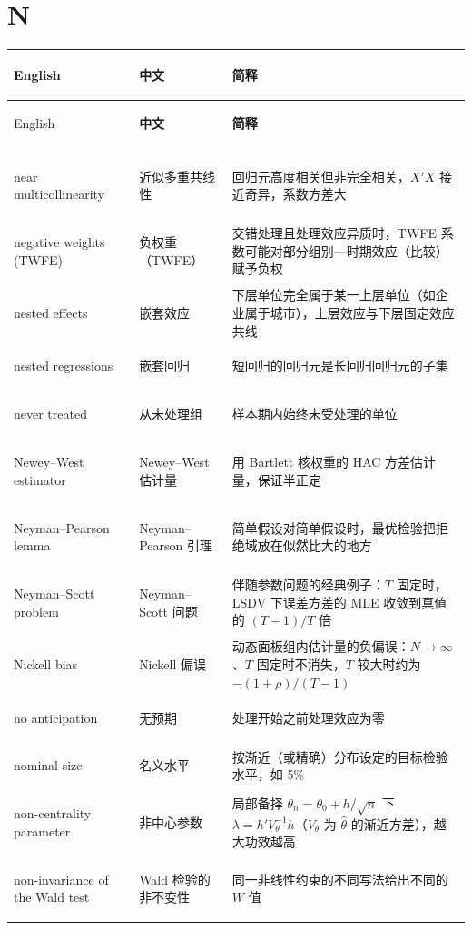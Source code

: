 \section*{N}
\begin{longtable}{@{}>{\bfseries\boldmath\raggedright\arraybackslash}p{4.6cm}>{\raggedright\arraybackslash}p{3.2cm}>{\raggedright\arraybackslash}p{\dimexpr\textwidth-7.8cm-4\tabcolsep\relax}@{}}
\toprule
English & \textbf{中文} & \textbf{简释}\\
\midrule
\endfirsthead
\toprule
English & \textbf{中文} & \textbf{简释}\\
\midrule
\endhead
\midrule
\multicolumn{3}{r@{}}{\footnotesize\itshape （续下页）}\\
\endfoot
\bottomrule
\endlastfoot
near multicollinearity & 近似多重共线性 & 回归元高度相关但非完全相关，$X'X$ 接近奇异，系数方差大 \\
negative weights (TWFE) & 负权重（TWFE） & 交错处理且处理效应异质时，TWFE 系数可能对部分组别—时期效应（比较）赋予负权 \\
nested effects & 嵌套效应 & 下层单位完全属于某一上层单位（如企业属于城市），上层效应与下层固定效应共线 \\
nested regressions & 嵌套回归 & 短回归的回归元是长回归回归元的子集 \\
never treated & 从未处理组 & 样本期内始终未受处理的单位 \\
Newey--West estimator & Newey--West 估计量 & 用 Bartlett 核权重的 HAC 方差估计量，保证半正定 \\
Neyman--Pearson lemma & Neyman--Pearson 引理 & 简单假设对简单假设时，最优检验把拒绝域放在似然比大的地方 \\
Neyman--Scott problem & Neyman--Scott 问题 & 伴随参数问题的经典例子：$T$ 固定时，LSDV 下误差方差的 MLE 收敛到真值的 $(T-1)/T$ 倍 \\
Nickell bias & Nickell 偏误 & 动态面板组内估计量的负偏误：$N\to\infty$、$T$ 固定时不消失，$T$ 较大时约为 $-(1+\rho)/(T-1)$ \\
no anticipation & 无预期 & 处理开始之前处理效应为零 \\
nominal size & 名义水平 & 按渐近（或精确）分布设定的目标检验水平，如 5\% \\
non-centrality parameter & 非中心参数 & 局部备择 $\theta_n=\theta_0+h/\sqrt n$ 下 $\lambda=h'V_\theta^{-1}h$（$V_\theta$ 为 $\hat\theta$ 的渐近方差），越大功效越高 \\
non-invariance of the Wald test & Wald 检验的非不变性 & 同一非线性约束的不同写法给出不同的 $W$ 值 \\

\end{longtable}
